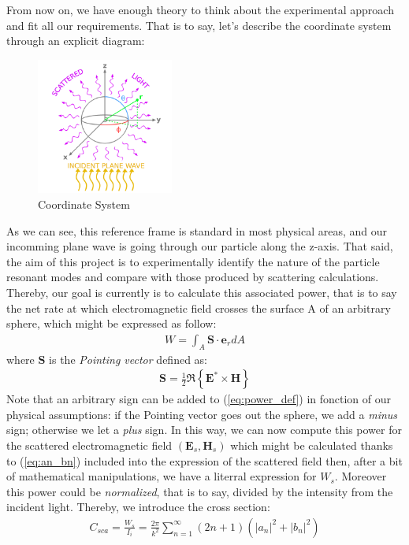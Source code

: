 \documentclass{article}
\numberwithin{equation}{section}
\begin{document}
From now on, we have enough theory to think about the experimental approach and fit all our requirements. That is to say, let's describe the coordinate system through an explicit diagram:
\begin{figure}[h]
    \centering
    \includegraphics[width=0.4\textwidth, height=0.4\textwidth]{reference_frame.png}
    \caption{Coordinate System}
    \label{fig:system}
\end{figure}
As we can see, this reference frame is standard in most physical areas, and our incomming plane wave is going through our particle along the z-axis. That said, the aim of this project is to experimentally identify the nature of the particle resonant modes and compare with those produced by scattering calculations. Thereby, our goal is currently is to calculate this associated power, that is to say the net rate at which electromagnetic field crosses the surface A of an arbitrary sphere, which might be expressed as follow:
\begin{align}\label{eq:power_def}
W=\int_{A}^{}\textbf{S}\cdot \textbf{e}_{r}dA
\end{align}
where $\textbf{S}$ is the \textit{Pointing vector} defined as:
\begin{align}
\textbf{S} = \frac{1}{2}\Re\left\{\textbf{E}^{*} \times \textbf{H}\right\}
\end{align}
Note that an arbitrary sign can be added to (\ref{eq:power_def}) in fonction of our physical assumptions: if the Pointing vector goes out the sphere, we add a \textit{minus} sign; otherwise we let a \textit{plus} sign. In this way, we can now compute this power for the scattered electromagnetic field $(\textbf{E}_{s}, \textbf{H}_{s})$ which might be calculated thanks to (\ref{eq:an_bn}) included into the expression of the scattered field then, after a bit of mathematical manipulations, we have a literral expression for $W_{s}$. Moreover this power could be \textit{normalized}, that is to say, divided by the intensity from the incident light. Thereby, we introduce the cross section:
\begin{align}\label{eq:csca}
C_{sca}=\frac{W_{s}}{I_{i}}=\frac{2\pi}{k^{2}}\sum_{n=1}^{\infty }(2n+1)(\left| a_{n} \right|^{2}+\left| b_{n} \right|^{2})
\end{align}
\end{document}
